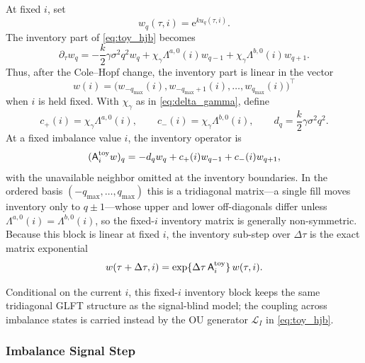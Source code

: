 \documentclass[11pt,a4paper]{article}
\newcommand{\Lcal}{\mathcal{L}}
\newcommand{\e}{\mathrm e}
\theoremstyle{plain}
\theoremstyle{definition}
\begin{document}
At fixed \(i\), set
\[
w_q(\tau,i)=\e^{k u_q(\tau,i)}.
\]
The inventory part of \eqref{eq:toy_hjb} becomes
\begin{equation}
\partial_\tau w_q
=
-\frac{k}{2}\gamma\sigma^2q^2w_q
+
\chi_\gamma
\Lambda^{a,0}(i)w_{q-1}
+
\chi_\gamma
\Lambda^{b,0}(i)w_{q+1}.
\label{eq:toy_w}
\end{equation}
Thus, after the Cole--Hopf change, the inventory part is linear in
the vector
\[
w(i)=
\bigl(w_{-q_{\max}}(i),w_{-q_{\max}+1}(i),\ldots,w_{q_{\max}}(i)\bigr)^\top
\]
when \(i\) is held fixed.  With \(\chi_\gamma\) as in \eqref{eq:delta_gamma},
define
\[
c_+(i)=\chi_\gamma\Lambda^{a,0}(i),
\qquad
c_-(i)=\chi_\gamma\Lambda^{b,0}(i),
\qquad
d_q=\frac{k}{2}\gamma\sigma^2q^2 .
\]
At a fixed imbalance value \(i\), the inventory operator is
\[
(\mathsf A_i^{\rm toy}w)_q
=
-d_qw_q+c_+(i)w_{q-1}+c_-(i)w_{q+1},
\]
with the unavailable neighbor omitted at the inventory boundaries.  In the
ordered basis \((-q_{\max},\ldots,q_{\max})\) this is a tridiagonal matrix---a
single fill moves inventory only to \(q\pm1\)---whose upper and lower
off-diagonals differ unless \(\Lambda^{a,0}(i)=\Lambda^{b,0}(i)\), so the
fixed-\(i\) inventory matrix is generally non-symmetric.
Because this block is linear at fixed \(i\), the inventory sub-step over
\(\Delta\tau\) is the exact matrix exponential
\[
w(\tau+\Delta\tau,i)=\exp\{\Delta\tau\,\mathsf A_i^{\rm toy}\}\,w(\tau,i).
\]

Conditional on the current \(i\), this fixed-\(i\) inventory block keeps the same
tridiagonal GLFT structure as the signal-blind model; the coupling across
imbalance states is carried instead by the OU generator \(\Lcal_I\) in
\eqref{eq:toy_hjb}.

\subsubsection{Imbalance Signal Step}
\label{subsubsec:toy_signal_step}
\end{document}
